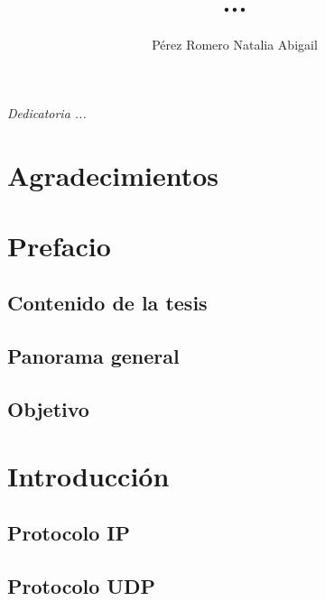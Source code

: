 \documentclass[letterpaper,12pt,oneside]{book}
\author{Pérez Romero Natalia Abigail}
\title{ ...}
\begin{document}
\frontmatter
\maketitle

\chapter*{}
\begin{flushright}%
  \emph{Dedicatoria ...}
  \thispagestyle{empty}
\end{flushright}

\chapter{Agradecimientos}

\tableofcontents

\chapter{Prefacio}

\section*{Contenido de la tesis}
\section*{Panorama general}
\section*{Objetivo}
    
\mainmatter

\chapter{Introducción} %

\section{Protocolo IP} %
\section{Protocolo UDP} %
\end{document}
